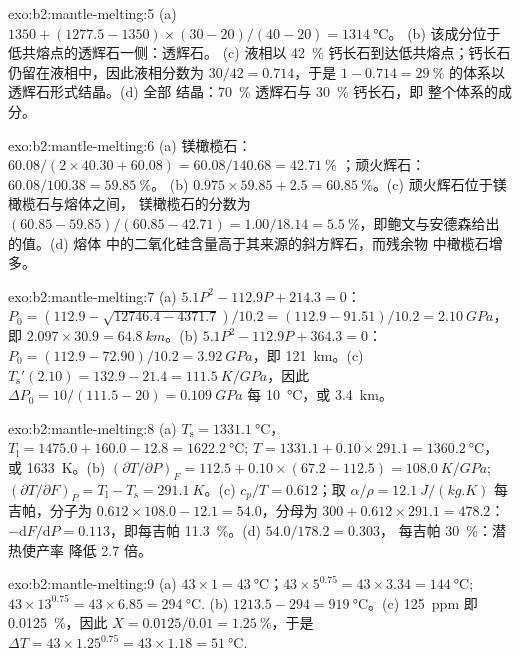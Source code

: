 \begin{solution}{exo:b2:mantle-melting:5}
(a) $1350 + (1277.5 - 1350)\times(30 - 20)/(40 - 20) = \qty{1314}{\celsius}$。
(b) 该成分位于低共熔点的透辉石一侧：透辉石。
(c) 液相以 \qty{42}{\percent} 钙长石到达低共熔点；钙长石
仍留在液相中，因此液相分数为 $30/42 = 0.714$，于是 $1 - 0.714 =
\qty{29}{\percent}$ 的体系以透辉石形式结晶。(d) 全部
结晶：\qty{70}{\percent} 透辉石与 \qty{30}{\percent} 钙长石，即
整个体系的成分。
\end{solution}

\begin{solution}{exo:b2:mantle-melting:6}
(a) 镁橄榄石：$60.08/(2\times40.30 + 60.08) = 60.08/140.68 =
\qty{42.71}{\percent}$ ；顽火辉石：$60.08/100.38 = \qty{59.85}{\percent}$。
(b) $0.975\times59.85 + 2.5 = \qty{60.85}{\percent}$。(c) 顽火辉石位于镁橄榄石与熔体之间，
镁橄榄石的分数为 $(60.85 - 59.85)/(60.85 -
42.71) = 1.00/18.14 = \qty{5.5}{\percent}$，即鲍文与安德森给出的值。(d) 熔体
中的二氧化硅含量高于其来源的斜方辉石，而残余物
中橄榄石增多。
\end{solution}

\begin{solution}{exo:b2:mantle-melting:7}
(a) $5.1P^2 - 112.9P + 214.3 = 0$：$P_0 = (112.9 - \sqrt{12746.4 -
4371.7})/10.2 = (112.9 - 91.51)/10.2 = \qty{2.10}{GPa}$，即 $2.097\times30.9 =
\qty{64.8}{km}$。(b) $5.1P^2 - 112.9P + 364.3 = 0$：$P_0 = (112.9 -
72.90)/10.2 = \qty{3.92}{GPa}$，即 \qty{121}{km}。(c) $T_{\mathrm s}'(2.10) = 132.9
- 21.4 = \qty{111.5}{K/GPa}$，因此 $\Delta P_0 = 10/(111.5 - 20) = \qty{0.109}{GPa}$
每 \qty{10}{\celsius}，或 \qty{3.4}{km}。
\end{solution}

\begin{solution}{exo:b2:mantle-melting:8}
(a) $T_{\mathrm s} = \qty{1331.1}{\celsius}$，$T_{\mathrm l} = 1475.0 + 160.0 -
12.8 = \qty{1622.2}{\celsius}$; $T = 1331.1 + 0.10\times291.1 =
\qty{1360.2}{\celsius}$，或 \qty{1633}{K}。(b) $(\partial T/\partial P)_F = 112.5
+ 0.10\times(67.2 - 112.5) = \qty{108.0}{K/GPa}$; $(\partial T/\partial F)_P =
T_{\mathrm l} - T_{\mathrm s} = \qty{291.1}{K}$。(c) $c_p/T = 0.612$；取 $\alpha/\rho
= \qty{12.1}{J/(kg.K)}$ 每吉帕，分子为 $0.612\times108.0 - 12.1
= 54.0$，分母为 $300 + 0.612\times291.1 = 478.2$：$-\mathrm dF/\mathrm
dP = 0.113$，即每吉帕 \qty{11.3}{\percent}。(d) $54.0/178.2 = 0.303$，
每吉帕 \qty{30}{\percent}：潜热使产率
降低 2.7 倍。
\end{solution}

\begin{solution}{exo:b2:mantle-melting:9}
(a) $43\times1 = \qty{43}{\celsius}$；$43\times5^{0.75} = 43\times3.34 =
\qty{144}{\celsius}$; $43\times13^{0.75} = 43\times6.85 = \qty{294}{\celsius}$.
(b) $1213.5 - 294 = \qty{919}{\celsius}$。(c) \qty{125}{ppm} 即
\qty{0.0125}{\percent}，因此 $X = 0.0125/0.01 = \qty{1.25}{\percent}$，于是 $\Delta T =
43\times1.25^{0.75} = 43\times1.18 = \qty{51}{\celsius}$.
\end{solution}

